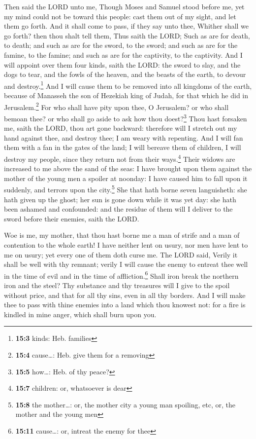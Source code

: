  Then said the LORD unto me, Though Moses and Samuel stood
before me, yet my mind could not be toward this people: cast them out of
my sight, and let them go forth.  And it shall come to
pass, if they say unto thee, Whither shall we go forth? then thou shalt
tell them, Thus saith the LORD; Such as are for death, to death; and
such as are for the sword, to the sword; and such as are for the famine,
to the famine; and such as are for the captivity, to the captivity.
 And I will appoint over them four kinds, saith the LORD:
the sword to slay, and the dogs to tear, and the fowls of the heaven,
and the beasts of the earth, to devour and destroy.\footnote{\textbf{15:3}
  kinds: Heb. families}  And I will cause them to be
removed into all kingdoms of the earth, because of Manasseh the son of
Hezekiah king of Judah, for that which he did in Jerusalem.\footnote{\textbf{15:4}
  cause\ldots: Heb. give them for a removing}  For who
shall have pity upon thee, O Jerusalem? or who shall bemoan thee? or who
shall go aside to ask how thou doest?\footnote{\textbf{15:5} how\ldots:
  Heb. of thy peace?}  Thou hast forsaken me, saith the
LORD, thou art gone backward: therefore will I stretch out my hand
against thee, and destroy thee; I am weary with repenting.
 And I will fan them with a fan in the gates of the land;
I will bereave them of children, I will destroy my people, since they
return not from their ways.\footnote{\textbf{15:7} children: or,
  whatsoever is dear}  Their widows are increased to me
above the sand of the seas: I have brought upon them against the mother
of the young men a spoiler at noonday: I have caused him to fall upon it
suddenly, and terrors upon the city.\footnote{\textbf{15:8} the
  mother\ldots: or, the mother city a young man spoiling, etc, or, the
  mother and the young men}  She that hath borne seven
languisheth: she hath given up the ghost; her sun is gone down while it
was yet day: she hath been ashamed and confounded: and the residue of
them will I deliver to the sword before their enemies, saith the LORD.

 Woe is me, my mother, that thou hast borne me a man of
strife and a man of contention to the whole earth! I have neither lent
on usury, nor men have lent to me on usury; yet every one of them doth
curse me.  The LORD said, Verily it shall be well with
thy remnant; verily I will cause the enemy to entreat thee well in the
time of evil and in the time of affliction.\footnote{\textbf{15:11}
  cause\ldots: or, intreat the enemy for thee}  Shall
iron break the northern iron and the steel?  Thy
substance and thy treasures will I give to the spoil without price, and
that for all thy sins, even in all thy borders.  And I
will make thee to pass with thine enemies into a land which thou knowest
not: for a fire is kindled in mine anger, which shall burn upon you.

